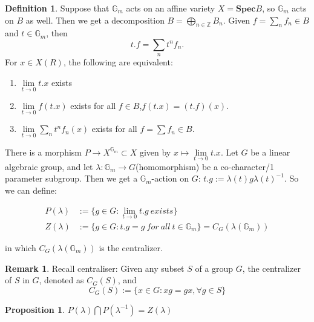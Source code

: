 \documentclass[12pt,a4paper,english]{article}
\theoremstyle{plain}
\newtheorem{prop}[thm]{Proposition}
\theoremstyle{definition}
\newtheorem{defi}[thm]{Definition}
\newtheorem*{rem}{Remark}
\begin{document}
\begin{defi}

Suppose that $\mathbb{G}_{m}$ acts on an affine variety $X=\textbf{Spec}B$, so $\mathbb{G}
_{m}$ acts on $B$ as well. Then we get a decomposition $B=\bigoplus\limits_{n\in\mathbb{Z}} B_{n}$. Given $f=\sum_{n}f_{n}\in B$ and $t\in \mathbb{G}_{m}$, then 
\begin{equation*}
    t.f=\sum_{n}t^{n}f_{n}.
\end{equation*}
For $x\in X(R)$, the following are equivalent:
\begin{enumerate}
    \item $\lim\limits_{t\rightarrow0}t.x$ exists
    \item $\lim\limits_{t\rightarrow0}f(t.x)$ exists for all $f\in B$,$f(t.x)=(t.f)(x)$.
    \item $\lim\limits_{t\rightarrow0}\sum_{n}t^{n}f_{n}(x)$ exists for all $f=\sum f_{n}\in B$.
\end{enumerate}

There is a morphism $P\rightarrow X^{\mathbb{G}_{m}}\subset X$ given by $x\mapsto \lim\limits_{t\rightarrow 0} t.x$. Let $G$ be a linear algebraic group, and let $\lambda:\mathbb{G}_{m}\rightarrow G$(homomorphism) be a co-character/1 parameter subgroup. Then we get a $\mathbb{G}_{m}$-action on $G$: $t.g :=\lambda(t)g\lambda(t)^{-1}$. So we can define:

\begin{align*}
        P(\lambda)&:=\{g\in G:\lim\limits_{t\rightarrow 0} t.g\ exists\}\\
        Z(\lambda)&:=\{g\in G:t.g=g\ for\ all\ t\in\mathbb{G}_{m}\}=C_{G}(\lambda(\mathbb{G}_{m}))
\end{align*}

in which $C_{G}(\lambda(\mathbb{G}_{m}))$ is the centralizer.
\end{defi}
\begin{rem}
Recall centraliser:
Given any subset $S$ of a group $G$, the centralizer of $S$ in $G$, denoted as $C_{G}(S)$, and \begin{equation*}
    C_{G}(S):=\{x\in G:xg=gx,\forall g\in S\}
\end{equation*}
\end{rem}
\begin{prop}
$P(\lambda)\bigcap P(\lambda^{-1})=Z(\lambda)$
\end{prop}
\end{document}
